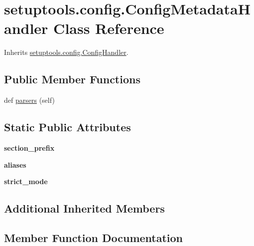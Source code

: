 \hypertarget{classsetuptools_1_1config_1_1_config_metadata_handler}{}\section{setuptools.\+config.\+Config\+Metadata\+Handler Class Reference}
\label{classsetuptools_1_1config_1_1_config_metadata_handler}


Inherits \hyperlink{classsetuptools_1_1config_1_1_config_handler}{setuptools.\+config.\+Config\+Handler}.

\subsection*{Public Member Functions}
\begin{DoxyCompactItemize}
\item 
def \hyperlink{classsetuptools_1_1config_1_1_config_metadata_handler_a79d5728ed108d5aaa690deca115678f1}{parsers} (self)
\end{DoxyCompactItemize}
\subsection*{Static Public Attributes}
\begin{DoxyCompactItemize}
\item 
\mbox{\label{classsetuptools_1_1config_1_1_config_metadata_handler_a2d5234778e591973dec7405a3072ca1b}} 
{\bfseries section\+\_\+prefix}
\item 
\mbox{\label{classsetuptools_1_1config_1_1_config_metadata_handler_afe449eb2495dc8620819a6d36166335a}} 
{\bfseries aliases}
\item 
\mbox{\label{classsetuptools_1_1config_1_1_config_metadata_handler_aab767a0aea5ab1fe06d2ea63ef5475f8}} 
{\bfseries strict\+\_\+mode}
\end{DoxyCompactItemize}
\subsection*{Additional Inherited Members}


\subsection{Member Function Documentation}
\mbox{\label{classsetuptools_1_1config_1_1_config_metadata_handler_a79d5728ed108d5aaa690deca115678f1}} 
